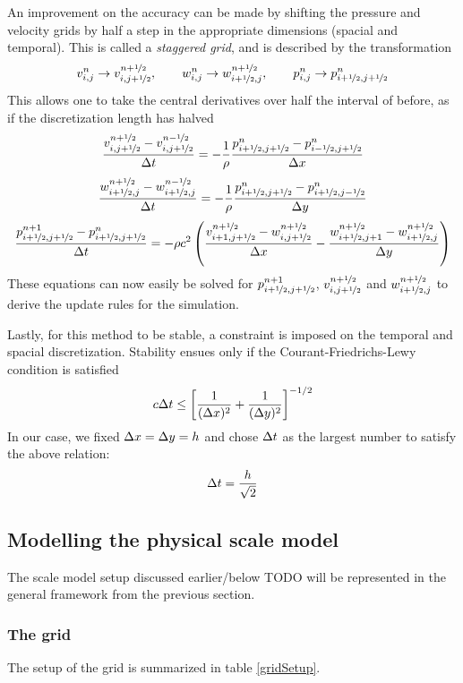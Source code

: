An improvement on the accuracy can be made by shifting the pressure and velocity grids by half a step in the appropriate dimensions (spacial and temporal). This is called a \emph{staggered grid}\cite{staggered-grid}, and is described by the transformation
$$
v_{i,j}^n \to v_{i,j+\nicefrac{1}{2}}^{n+\nicefrac{1}{2}}
, \qquad
w_{i,j}^n \to w_{i+\nicefrac{1}{2},j}^{n+\nicefrac{1}{2}}
, \qquad
p_{i,j}^n \to p^n_{i+\nicefrac{1}{2}, j+\nicefrac{1}{2}}
$$
This allows one to take the central derivatives over half the interval of before, as if the discretization length has halved
$$
\frac{v_{i,j+\nicefrac{1}{2}}^{n+\nicefrac{1}{2}} - v_{i,j+\nicefrac{1}{2}}^{n-\nicefrac{1}{2}}}{\Delta t}
	= -\frac{1}{\rho} \frac{p^n_{i+\nicefrac{1}{2},j+\nicefrac{1}{2}} - p^n_{i-\nicefrac{1}{2},j+\nicefrac{1}{2}}}{\Delta x}
$$
$$
\frac{w_{i+\nicefrac{1}{2},j}^{n+\nicefrac{1}{2}} - w_{i+\nicefrac{1}{2},j}^{n-\nicefrac{1}{2}}}{\Delta t}
	= -\frac{1}{\rho} \frac{p^n_{i+\nicefrac{1}{2},j+\nicefrac{1}{2}} - p^n_{i+\nicefrac{1}{2},j-\nicefrac{1}{2}}}{\Delta y}
$$
$$
\frac{p_{i+\nicefrac{1}{2},j+\nicefrac{1}{2}}^{n+1} - p_{i+\nicefrac{1}{2},j+\nicefrac{1}{2}}^{n}}{\Delta t} = 
	-\rho c^2 \left(
		\frac{v_{i+1,j+\nicefrac{1}{2}}^{n+\nicefrac{1}{2}} 
			- w_{i,j+\nicefrac{1}{2}}^{n+\nicefrac{1}{2}}}{\Delta x}
		- \frac{w_{i+\nicefrac{1}{2},j+1}^{n+\nicefrac{1}{2}} 
			- w_{i+\nicefrac{1}{2},j}^{n+\nicefrac{1}{2}}}{\Delta y}
	\right)
$$
These equations can now easily be solved for $p^{n+1}_{i+\nicefrac{1}{2}, j+\nicefrac{1}{2}}$, $v_{i,j+\nicefrac{1}{2}}^{n+\nicefrac{1}{2}}$ and $w_{i+\nicefrac{1}{2},j}^{n+\nicefrac{1}{2}}$ to derive the update rules for the simulation.

Lastly, for this method to be stable, a constraint is imposed on the temporal and spacial discretization. Stability ensues only if the Courant-Friedrichs-Lewy condition is satisfied\cite{courant-friedrichs-lewy}\cite{numerical-stability-2D-FDTD}
$$
c\Delta t \leq \left[\frac{1}{(\Delta x)^2} + \frac{1}{(\Delta y)^2}\right] ^ {-1/2}
$$
In our case, we fixed $\Delta x = \Delta y = h$ and chose $\Delta t$ as the largest number to satisfy the above relation:
$$
\Delta t = \frac{h}{\sqrt{2}}
$$


\subsection{Modelling the physical scale model}
The scale model setup discussed earlier/below TODO will be represented in the general framework from the previous section.

\subsubsection*{The grid}
The setup of the grid is summarized in table \ref{gridSetup}.


